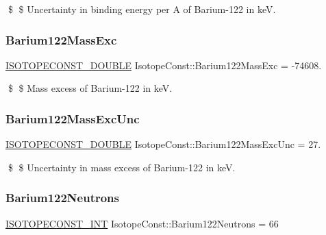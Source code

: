 \$ \$ Uncertainty in binding energy per A of Barium-\/122 in keV. \mbox{\label{group___isotope_const-_barium-_ba122_ga565d3ffd989468839fe47091230b6c30}} 
\subsubsection{\texorpdfstring{Barium122\+Mass\+Exc}{Barium122MassExc}}
{\footnotesize\ttfamily \mbox{\hyperlink{group___isotope_const-_macros_ga8f45a7272ce02c0b4c65c44636ed719a}{I\+S\+O\+T\+O\+P\+E\+C\+O\+N\+S\+T\+\_\+\+D\+O\+U\+B\+LE}} Isotope\+Const\+::\+Barium122\+Mass\+Exc = -\/74608.}

\$ \$ Mass excess of Barium-\/122 in keV. \mbox{\label{group___isotope_const-_barium-_ba122_ga0500278aea42dcc157d4045e398d3483}} 
\subsubsection{\texorpdfstring{Barium122\+Mass\+Exc\+Unc}{Barium122MassExcUnc}}
{\footnotesize\ttfamily \mbox{\hyperlink{group___isotope_const-_macros_ga8f45a7272ce02c0b4c65c44636ed719a}{I\+S\+O\+T\+O\+P\+E\+C\+O\+N\+S\+T\+\_\+\+D\+O\+U\+B\+LE}} Isotope\+Const\+::\+Barium122\+Mass\+Exc\+Unc = 27.}

\$ \$ Uncertainty in mass excess of Barium-\/122 in keV. \mbox{\label{group___isotope_const-_barium-_ba122_ga3eecf866a8f7b657ade0c614a8f548c6}} 
\subsubsection{\texorpdfstring{Barium122\+Neutrons}{Barium122Neutrons}}
{\footnotesize\ttfamily \mbox{\hyperlink{group___isotope_const-_macros_ga5f18360b3e99483a35c32d789e62621c}{I\+S\+O\+T\+O\+P\+E\+C\+O\+N\+S\+T\+\_\+\+I\+NT}} Isotope\+Const\+::\+Barium122\+Neutrons = 66}

